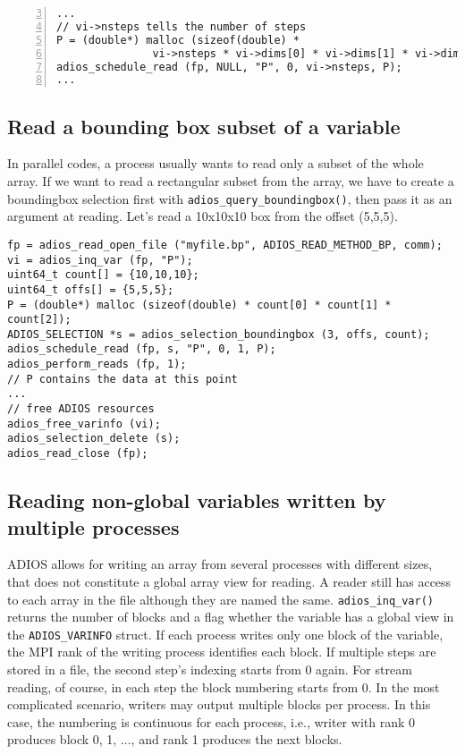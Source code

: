 \begin{lstlisting}[frame=no, emph={nsteps}, emphstyle={\color{red}\large\bf},
                             numbers=left, numberstyle=\color{gray}, stepnumber=2,firstnumber=3]
...
// vi->nsteps tells the number of steps
P = (double*) malloc (sizeof(double) * 
               vi->nsteps * vi->dims[0] * vi->dims[1] * vi->dims[2]);
adios_schedule_read (fp, NULL, "P", 0, vi->nsteps, P);
...
\end{lstlisting}


\subsection{Read a bounding box subset of a variable}
In parallel codes, a process usually wants to read only a subset of the whole array. If we want to read a rectangular subset from the array, we have to create a boundingbox selection first with \verb+adios_query_boundingbox()+, then pass it as an argument at reading. Let's read a 10x10x10 box from the offset (5,5,5). 


\begin{lstlisting}[numbers=none,
                             caption={Read a bounding box of a variable},  label=code:boundingbox]
fp = adios_read_open_file ("myfile.bp", ADIOS_READ_METHOD_BP, comm);
vi = adios_inq_var (fp, "P");
uint64_t count[] = {10,10,10};
uint64_t offs[] = {5,5,5};
P = (double*) malloc (sizeof(double) * count[0] * count[1] * count[2]);
ADIOS_SELECTION *s = adios_selection_boundingbox (3, offs, count);
adios_schedule_read (fp, s, "P", 0, 1, P);
adios_perform_reads (fp, 1);   
// P contains the data at this point
...
// free ADIOS resources
adios_free_varinfo (vi); 
adios_selection_delete (s); 
adios_read_close (fp);
\end{lstlisting}


\subsection{Reading non-global variables written by multiple processes}
\label {section:non_global_vars}
ADIOS allows for writing an array from several processes with different sizes, that does not constitute a global array view for reading. A reader still has access to each array in the file although they are named the same. \verb+adios_inq_var()+ returns the number of blocks and a flag whether the variable has a global view in the \verb+ADIOS_VARINFO+ struct. If each process writes only one block of the variable, the MPI rank of the writing process identifies each block.  If multiple steps are stored in a file, the second step's indexing starts from 0 again. For stream reading, of course, in each step the block numbering starts from 0. In the most complicated scenario, writers may output multiple blocks per process. In this case, the numbering is continuous for each process, i.e., writer with rank 0 produces block 0, 1, ..., and rank 1 produces the next blocks. 

